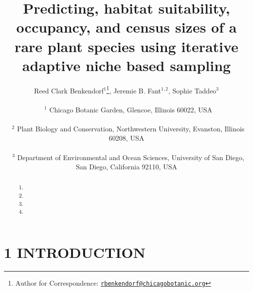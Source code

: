 \documentclass[
]{article}
\title{Predicting, habitat suitability, occupancy, and census sizes of a
rare plant species using iterative adaptive niche based sampling}
\author{Reed Clark Benkendorf\(^1\)\footnote{Author for Correspondence:
  \href{mailto:rbenkendorf@chicagobotanic.org}{\nolinkurl{rbenkendorf@chicagobotanic.org}}},
Jeremie B. Fant\(^1\)\(^,\)\(^2\), Sophie Taddeo\(^3\)\\
\strut ~\(^1\) Chicago Botanic Garden, Glencoe, Illinois 60022, USA\\
\strut ~\(^2\) Plant Biology and Conservation, Northwestern University,
Evanston, Illinois 60208, USA\\
\strut ~\(^3\) Department of Environmental and Ocean Sciences,
University of San Diego, San Diego, California 92110, USA}
\date{}
\providecommand{\tightlist}{%
  \setlength{\itemsep}{0pt}\setlength{\parskip}{0pt}}
\begin{document}
\maketitle
\begin{abstract}
\begin{enumerate}
\def\labelenumi{\arabic{enumi})}
\tightlist
\item
\item
\item
\item
\end{enumerate}
\end{abstract}

\section{1 \textbar{} INTRODUCTION}\label{introduction}
\end{document}
